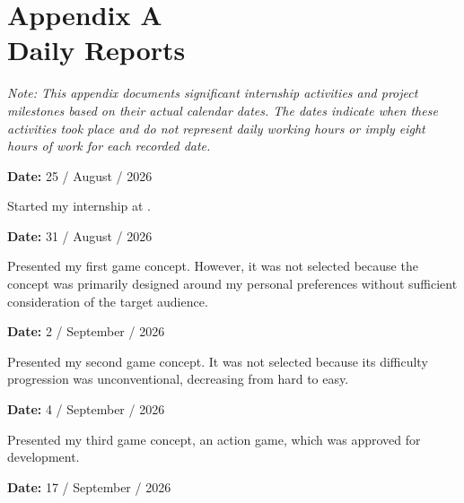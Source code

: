 
\chapter*{Appendix A \\ Daily Reports}

\noindent
\textit{Note: This appendix documents significant internship activities and
project milestones based on their actual calendar dates. The dates indicate
when these activities took place and do not represent daily working hours
or imply eight hours of work for each recorded date.}

\vspace{1.5em}

\noindent
\textbf{Date:} 25 / August / 2026
\vspace{0.5em}

\noindent
Started my internship at \companyName{}.

\vspace{1.5em}

\noindent
\textbf{Date:} 31 / August / 2026
\vspace{0.5em}

\noindent
Presented my first game concept. However, it was not selected because
the concept was primarily designed around my personal preferences
without sufficient consideration of the target audience.

\vspace{1.5em}

\noindent
\textbf{Date:} 2 / September / 2026
\vspace{0.5em}

\noindent
Presented my second game concept. It was not selected because its
difficulty progression was unconventional, decreasing from hard to easy.

\vspace{1.5em}

\noindent
\textbf{Date:} 4 / September / 2026
\vspace{0.5em}

\noindent
Presented my third game concept, an action game, which was approved
for development.

\vspace{1.5em}

\noindent
\textbf{Date:} 17 / September / 2026
\vspace{0.5em}

